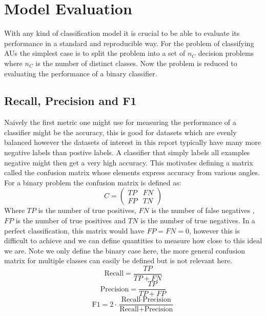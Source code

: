   \section{Model Evaluation} \label{sec:eval}
    With any kind of classification model it is crucial to be able to evaluate its
    performance in a standard and reproducible way. For the problem of classifying
    AUs the simplest case is to split the problem into a set of $n_C$ decision problems
    where $n_C$ is the number of distinct classes. Now the problem is reduced to
    evaluating the performance of a binary classifier.

    \subsection{Recall, Precision and F1}
      Naively the first metric one might use for measuring the performance of a classifier
      might be the accuracy, this is good for datasets which are evenly balanced however
      the datasets of interest in this report typically have many more negative labels than postive labels.
      A classifier that simply labels all examples negative might then get a very high accuracy. This motivates
      defining a matrix called the confusion matrix whose elements express accuracy from various angles.
      For a binary problem the confusion matrix is defined as:
      \begin{equation}
        C =
        \begin{pmatrix}
          TP & FN\\
          FP & TN
        \end{pmatrix}
      \end{equation}
      Where $TP$ is the number of true positives, $FN$ is the number of false negatives
      , $FP$ is the number of true positives and $TN$ is the number of true negatives.
      In a perfect classification, this matrix would have $FP=FN=0$, however this is
      difficult to achieve
      and we can define quantities to measure how close to this ideal we are. Note we
      only define the binary case here, the more general confusion matrix for multiple
      classes can easily be defined but is not relevant here.
      \begin{equation}
        \text{Recall} = \frac{TP}{TP+FN}
      \end{equation}
      \begin{equation}
        \text{Precision} = \frac{TP}{TP+FP}
      \end{equation}
      \begin{equation}
        \text{F1} = 2 \cdot \frac{\text{Recall} \cdot \text{Precision}}{\text{Recall} + \text{Precision}}
      \end{equation}

